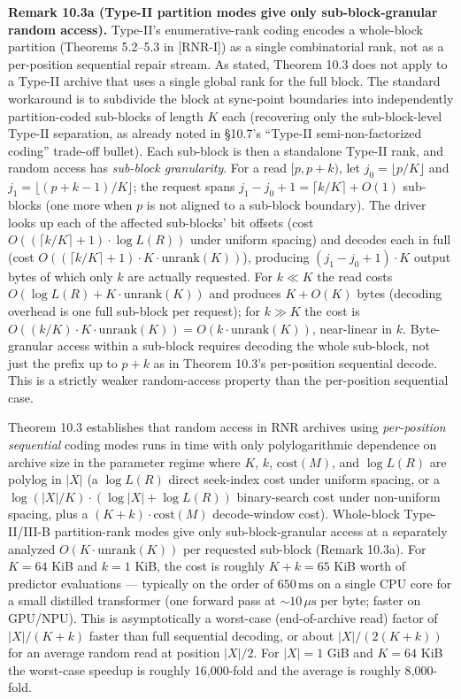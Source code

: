 \documentclass[
]{article}
\begin{document}
\textbf{Remark 10.3a (Type-II partition modes give only
sub-block-granular random access).} Type-II's enumerative-rank
coding encodes a whole-block partition (Theorems 5.2--5.3 in [RNR-I]) as a
single combinatorial rank, not as a per-position sequential repair
stream. As stated, Theorem 10.3 does not apply to a Type-II archive
that uses a single global rank for the full block. The standard
workaround is to subdivide the block at sync-point boundaries into
independently partition-coded sub-blocks of length $K$ each
(recovering only the sub-block-level Type-II separation, as already
noted in §10.7's ``Type-II semi-non-factorized coding'' trade-off
bullet). Each sub-block is then a standalone Type-II rank, and
random access has \emph{sub-block granularity}. For a read
$[p, p+k)$, let $j_0 = \lfloor p/K \rfloor$ and
$j_1 = \lfloor (p+k-1)/K \rfloor$; the request spans
$j_1 - j_0 + 1 = \lceil k/K \rceil + O(1)$ sub-blocks (one more
when $p$ is not aligned to a sub-block boundary). The driver looks
up each of the affected sub-blocks' bit offsets (cost
$O((\lceil k/K \rceil + 1) \cdot \log L(R))$ under uniform spacing)
and decodes each in full (cost $O((\lceil k/K \rceil + 1) \cdot K
\cdot \mathrm{unrank}(K))$), producing $(j_1 - j_0 + 1) \cdot K$
output bytes of which only $k$ are actually requested. For
$k \ll K$ the read costs $O(\log L(R) + K \cdot \mathrm{unrank}(K))$
and produces $K + O(K)$ bytes (decoding overhead is one full
sub-block per request); for $k \gg K$ the cost is
$O((k/K) \cdot K \cdot \mathrm{unrank}(K)) = O(k \cdot
\mathrm{unrank}(K))$, near-linear in $k$. Byte-granular access
within a sub-block requires decoding the whole sub-block, not just
the prefix up to $p+k$ as in Theorem 10.3's per-position sequential
decode. This is a strictly weaker random-access property than the
per-position sequential case.

Theorem 10.3 establishes that random access in RNR archives using
\emph{per-position sequential} coding modes runs in time with only
polylogarithmic dependence on archive size in the parameter regime
where $K$, $k$, $\mathrm{cost}(M)$, and $\log L(R)$ are polylog in
$|X|$ (a $\log L(R)$ direct seek-index cost under uniform spacing,
or a $\log(|X|/K) \cdot (\log |X| + \log L(R))$ binary-search cost
under non-uniform spacing, plus a $(K+k) \cdot \mathrm{cost}(M)$
decode-window cost).
Whole-block Type-II/III-B partition-rank modes give only
sub-block-granular access at a separately analyzed
$O(K \cdot \mathrm{unrank}(K))$ per requested sub-block (Remark
10.3a). For $K = 64$ KiB and $k = 1$ KiB, the cost is roughly
$K + k = 65$ KiB worth of predictor evaluations --- typically on
the order of $650\,\text{ms}$ on a single CPU core for a small
distilled transformer (one forward pass at $\sim 10\,\mu\text{s}$
per byte; faster on GPU/NPU). This is asymptotically a worst-case (end-of-archive read)
factor of $|X|/(K + k)$ faster than full sequential decoding, or
about $|X| / (2(K + k))$ for an average random read at position
$|X|/2$. For $|X| = 1$ GiB and $K = 64$ KiB the worst-case
speedup is roughly 16{,}000-fold and the average is roughly
8{,}000-fold.
\end{document}
